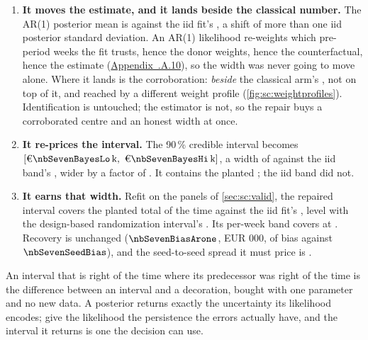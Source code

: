 \begin{enumerate}[leftmargin=*]
  \item \textbf{It moves the estimate, and it lands beside the classical number.} The AR(1)
        posterior mean is \keur{\nbSevenBayesTotal} against the iid fit's \keur{\nbSevenIidTotal}, a
        shift of more than one iid posterior standard deviation. An AR(1) likelihood re-weights
        which pre-period weeks the fit trusts, hence the donor weights, hence the counterfactual,
        hence the estimate (\hyperref[app:sc:ar1]{Appendix~\thechapter.A.10}), so the width was never
        going to move alone. Where it lands is the corroboration: \emph{beside} the classical arm's
        \keur{\nbSevenClTotal}, not on top of it, and reached by a different weight profile
        (\cref{fig:sc:weightprofiles}). Identification is untouched; the estimator is not, so the
        repair buys a corroborated centre and an honest width at once.
  \item \textbf{It re-prices the interval.} The 90\,\% credible interval becomes
        $[\keur{\nbSevenBayesLo},\ \keur{\nbSevenBayesHi}]$, a width of \keur{\nbSevenBayesWidth}
        against the iid band's \keur{\nbSevenIidWidth}, wider by a factor of
        \nbSevenWidthRatio{}. It contains the planted \keur{\nbSevenTrueTotal}; the iid band did
        not.
  \item \textbf{It earns that width.} Refit on the \nbSevenNPanels{} panels of
        \cref{sec:sc:valid}, the repaired interval covers the planted total \pc{\nbSevenTotalCovArone}
        of the time against the iid fit's \pc{\nbSevenTotalCov}, level with the design-based
        randomization interval's \pc{\nbSevenRiCov}. Its per-week band covers at
        \pc{\nbSevenWeekCovArone}. Recovery is unchanged ($\nbSevenBiasArone$, EUR 000, of bias
        against $\nbSevenSeedBias$), and the seed-to-seed spread it must price is
        \keur{\nbSevenSeedSdArone}.
\end{enumerate}

An interval that is right \pc{\nbSevenTotalCovArone} of the time where its predecessor was right
\pc{\nbSevenTotalCov} of the time is the difference between an interval and a decoration, bought
with one parameter and no new data. A posterior returns exactly the uncertainty its likelihood
encodes; give the likelihood the persistence the errors actually have, and the interval it returns
is one the decision can use.

